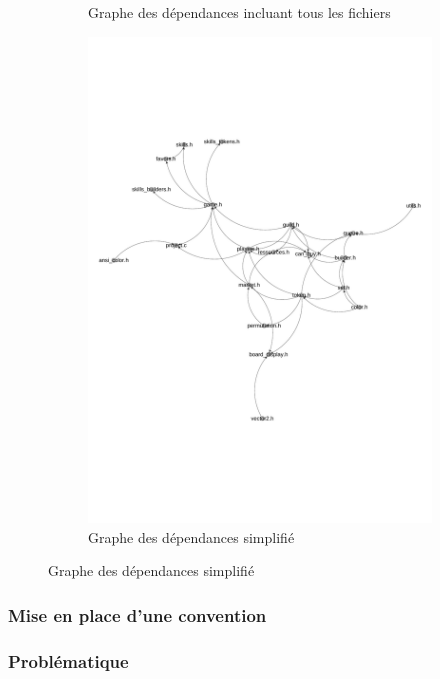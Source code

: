 \begin{figure}[H]
\begin{subfigure}[b]{0.45\textwidth}
        \caption{Graphe des dépendances incluant tous les fichiers}
    \end{subfigure}
    \begin{subfigure}[b]{0.45\textwidth}
        \includegraphics[width=\textwidth]{img/graph_reduce4.4.2.pdf}
        \caption{Graphe des dépendances simplifié}
    \end{subfigure}
\end{figure}




\subsubsection*{Mise en place d'une convention}


\subsubsection*{Problématique}


